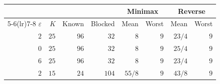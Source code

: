 \begin{tabular}{@{}rrrrrrrr@{}}
\toprule
& & & & \multicolumn{2}{c}{Minimax} & \multicolumn{2}{c}{Reverse} \\
\cmidrule(lr){5-6}\cmidrule(lr){7-8}
$\varepsilon$ & $K$ & Known & Blocked & Mean & Worst & Mean & Worst \\
\midrule
$2$ & $25$ & $96$ & $32$ & $8$ & $9$ & $23/4$ & $9$ \\
$0$ & $25$ & $96$ & $32$ & $8$ & $9$ & $25/4$ & $9$ \\
$6$ & $25$ & $96$ & $32$ & $8$ & $9$ & $23/4$ & $9$ \\
$2$ & $15$ & $24$ & $104$ & $55/8$ & $9$ & $43/8$ & $9$ \\
\bottomrule
\end{tabular}
